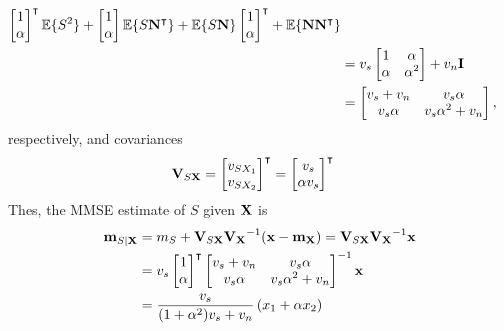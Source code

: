 \begin{solution}
\begin{parts}
\begin{align*}
	   \begin{bmatrix} 1 \\ \alpha \end{bmatrix}^\intercal \mathbb{E}\{S^2\} 
	 + \begin{bmatrix} 1 \\ \alpha \end{bmatrix} \mathbb{E}\{S {\bf N} ^\intercal \}  
	 + \mathbb{E}\{S {\bf N}\}  \begin{bmatrix} 1 \\ \alpha \end{bmatrix}^\intercal 
	 + \mathbb{E}\{{\bf N} {\bf N} ^\intercal \}  \\
	&= v_s \begin{bmatrix} 1 & \alpha \\ \alpha & \alpha^2 \end{bmatrix} + v_n {\bf I}  \\ 
	&= \begin{bmatrix} v_s + v_n & v_s \alpha \\ v_s \alpha & v_s \alpha^2 + v_n \end{bmatrix},
\end{align*}
respectively, and covariances
\begin{align*}
{\bf V}_{S{\bf X}}  
	&= \begin{bmatrix} v_{SX_1} \\ v_{SX_2} \end{bmatrix}^\intercal
	 = \begin{bmatrix} v_s \\ \alpha v_s \end{bmatrix}^\intercal
\end{align*}
Thes, the MMSE estimate of $S$ given ${\bf X}$ is
\begin{align*}
{\bf m}_{S |{\bf X}} 
      &= m_S + {\bf V}_{S {\bf X}}{\bf V_X}^{-1}({\bf x}-{\bf m}_{\bf X}) 
       = {\bf V}_{S {\bf X}}{\bf V_X}^{-1}{\bf x}  \\ 
      &= v_s \begin{bmatrix} 1 \\ \alpha \end{bmatrix}^\intercal  
         \begin{bmatrix} v_s + v_n & v_s \alpha \\ 
                         v_s \alpha & v_s \alpha^2 + v_n \end{bmatrix}^{-1}{\bf x}  \\ 
      &= \frac{v_s}{(1 + \alpha^2)v_s + v_n} \left( x_1 + \alpha x_2\right)
\end{align*}
\end{parts}
\end{solution}
\fi